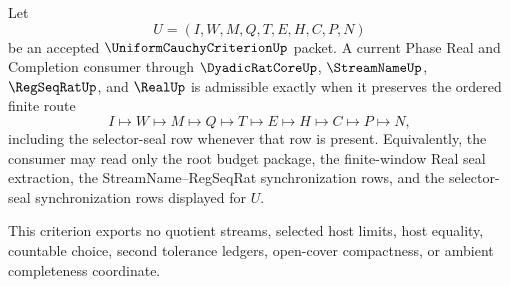 \begin{theorem}
\label{thm:uniform-cauchy-criterion-phase-real-route-iff}
Let
$$
U=(I,W,M,Q,T,E,H,C,P,N)
$$
be an accepted $\UniformCauchyCriterionUp$ packet. A current Phase Real and Completion consumer through $\DyadicRatCoreUp$, $\StreamNameUp$, $\RegSeqRatUp$, and $\RealUp$ is admissible exactly when it preserves the ordered finite route
$$
I \longmapsto W \longmapsto M \longmapsto Q \longmapsto T \longmapsto E \longmapsto H \longmapsto C \longmapsto P \longmapsto N,
$$
including the selector-seal row whenever that row is present. Equivalently, the consumer may read only the root budget package, the finite-window Real seal extraction, the StreamName--RegSeqRat synchronization rows, and the selector-seal synchronization rows displayed for $U$.

This criterion exports no quotient streams, selected host limits, host equality, countable choice, second tolerance ledgers, open-cover compactness, or ambient completeness coordinate.
\end{theorem}
